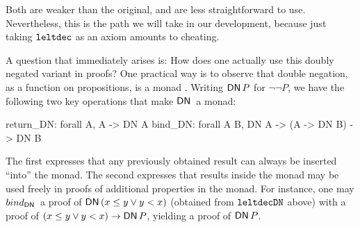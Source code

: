 \documentclass[runningheads]{llncs}
\newcommand{\Exists}[2]{\exists_{#1} \, . \, #2}
\newcommand{\weg}[1]{}
\newcommand{\DN}{{\sf DN}\,}
\newcommand{\IR}{{\mathbf R}}
\newcommand{\Inv}{{\rm Inv}}
\newcommand{\contrans}{\rightarrow_C}
\newcommand{\Dur}{{\IR_{\geq 0}}}
\newcommand{\leltdec}{{\tt leltdec}}
\newcommand{\leltdecDN}{{\tt leltdecDN}}
\begin{document}
Both are weaker than the original, and are less straightforward to
use. Nevertheless, this is the path we will take in our development,
because just taking $\leltdec$ as an axiom amounts to cheating.
\weg{ 
A place where we definitely need the stability of the invariant is in
proving the obvious and useful property of {\em transitivity of the
  continuous transition relation}: Suppose we have $(l, p) \contrans
(l, p')$ and $(l, p')\contrans (l, p'')$ for location $l$ and points
$p, p', p''$. 
To show $(l, p)\contrans (l, p'')$, we must show (among other things)
that the invariant holds at each point along the way. That is,
$$\forall t, 0 \leq t \leq d + d' \rightarrow \Inv_l( \Phi_L(p, t)).$$
We know this is true for $0 \leq t \leq d$, and we know that this is
true for $d \leq t \leq d + d'$. Classically, then, the proof is done,
for one can simply distinguish cases $t \leq d$ or $d < t$.  In our
transitivity proof, we will use the variant expressed using double
negation. Now we need only observe that $x \leq y$ is equivalent to $\neg(y < x)$, and that the law of the excluded middle holds under double negation. That is,
$\forall P( \neg  \neg  (P \vee \neg  P))$
is a trivial tautology.
}
A question that immediately arises is: How does one actually use this
doubly negated variant in proofs?  One practical way is to observe
that double negation, as a function on propositions, is a monad
\cite{wadler95monads}. Writing $\DN P$ for $\neg  \neg  P$, we have the following two key
operations that make $\DN$ a monad:

\begin{code}
  return_DN: forall A, A -> DN A
  bind_DN: forall A B, DN A -> (A -> DN B) -> DN B
\end{code}

The first expresses that any previously obtained result can always be
inserted ``into'' the monad. The second expresses that results inside
the monad may be used freely in proofs of additional properties in the
monad. For instance, one may $bind_{\DN}$ a proof of $\DN (x \leq y \vee y < x)$ 
(obtained from $\leltdecDN$ above) with a proof of $(x \leq y \vee y < x) \rightarrow \DN P$, yielding a proof of $\DN P$.
 
\end{document}
